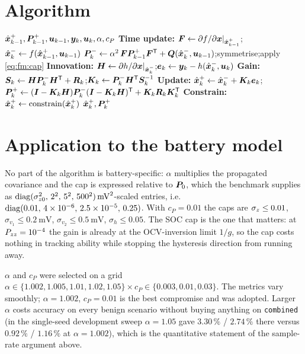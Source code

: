 \section{Algorithm}
\begin{algorithm}[H]
\caption{Fading-EKF --- one sampling period}
\begin{algorithmic}[1]
\Require $\hat{\bm{x}}^{+}_{k-1},\bm{P}^{+}_{k-1},\bm{u}_{k-1},\bm{y}_k,\bm{u}_k,\alpha,c_P$
\State \textbf{Time update:} $\bm{F}\gets\partial f/\partial\bm{x}|_{\hat{\bm{x}}^{+}_{k-1}}$;\quad $\hat{\bm{x}}^{-}_k\gets f(\hat{\bm{x}}^{+}_{k-1},\bm{u}_{k-1})$
\State \quad $\bm{P}^{-}_k\gets\alpha^2\,\bm{F}\bm{P}^{+}_{k-1}\bm{F}^{\mathsf{T}}+\bm{Q}(\hat{\bm{x}}^{-}_k,\bm{u}_{k-1})$;\quad symmetrise;\quad apply \eqref{eq:fm:cap}
\State \textbf{Innovation:} $\bm{H}\gets\partial h/\partial\bm{x}|_{\hat{\bm{x}}^{-}_k}$;\quad $\bm{e}_k\gets\bm{y}_k-h(\hat{\bm{x}}^{-}_k,\bm{u}_k)$
\State \textbf{Gain:} $\bm{S}_k\gets\bm{H}\bm{P}^{-}_k\bm{H}^{\mathsf{T}}+\bm{R}_k$;\quad $\bm{K}_k\gets\bm{P}^{-}_k\bm{H}^{\mathsf{T}}\bm{S}_k^{-1}$
\State \textbf{Update:} $\hat{\bm{x}}^{+}_k\gets\hat{\bm{x}}^{-}_k+\bm{K}_k\bm{e}_k$;\quad
       $\bm{P}^{+}_k\gets(\bm{I}-\bm{K}_k\bm{H})\bm{P}^{-}_k(\bm{I}-\bm{K}_k\bm{H})^{\mathsf{T}}+\bm{K}_k\bm{R}_k\bm{K}_k^{\mathsf{T}}$
\State \textbf{Constrain:} $\hat{\bm{x}}^{+}_k\gets\mathrm{constrain}(\hat{\bm{x}}^{+}_k)$
\Ensure $\hat{\bm{x}}^{+}_k,\bm{P}^{+}_k$
\end{algorithmic}
\end{algorithm}

\section{Application to the battery model}
No part of the algorithm is battery-specific: $\alpha$ multiplies the propagated covariance and the
cap is expressed relative to $\bm{P}_0$, which the benchmark supplies as
$\operatorname{diag}(\sigma_{z0}^2,\,2^2,\,5^2,\,500^2)\,\si{\milli\volt}^2$-scaled entries, i.e.\
$\operatorname{diag}(0.01,\,4\times10^{-6},\,2.5\times10^{-5},\,0.25)$.  With $c_P=0.01$ the caps are
$\sigma_z\le0.01$, $\sigma_{v_1}\le\SI{0.2}{\milli\volt}$, $\sigma_{v_2}\le\SI{0.5}{\milli\volt}$,
$\sigma_h\le0.05$.  The SOC cap is the one that matters: at $P_{zz}=10^{-4}$ the gain is
already at the OCV-inversion limit $1/g$, so the cap costs nothing in tracking ability while
stopping the hysteresis direction from running away.

$\alpha$ and $c_P$ were selected on a grid $\alpha\in\{1.002,1.005,1.01,1.02,1.05\}\times
c_P\in\{0.003,0.01,0.03\}$.  The metrics vary smoothly; $\alpha=1.002$, $c_P=0.01$ is the best
compromise and was adopted.  Larger $\alpha$ costs accuracy on every benign scenario without buying
anything on \texttt{combined} (in the single-seed development sweep $\alpha=1.05$ gave
$3.30\,\%$ / $2.74\,\%$ there versus $0.92\,\%$ / $1.16\,\%$ at $\alpha=1.002$), which is the
quantitative statement of the sample-rate
argument above.

